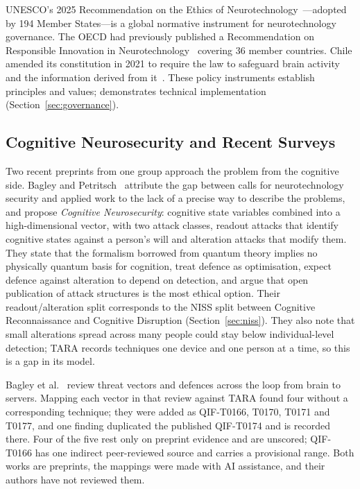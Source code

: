 UNESCO's 2025 Recommendation on the Ethics of
Neurotechnology~\cite{unesco2025recommendation}---adopted by 194 Member
States---is a global normative instrument for neurotechnology governance. The OECD had previously published a Recommendation on Responsible
Innovation in Neurotechnology~\cite{oecd2019neurotechnology} covering 36 member
countries. Chile amended its constitution in 2021 to require the law to safeguard brain
activity and the information derived from it~\cite{chile2021neurorights}. These policy instruments establish
principles and values; \qif demonstrates technical implementation
(Section~\ref{sec:governance}).

\subsection{Cognitive Neurosecurity and Recent Surveys}

Two recent preprints from one group approach the problem from the cognitive side.
Bagley and Petritsch~\cite{bagley2024mathematicalframework} attribute the gap between
calls for neurotechnology security and applied work to the lack of a precise way to
describe the problems, and propose \emph{Cognitive Neurosecurity}: cognitive state
variables combined into a high-dimensional vector, with two attack classes, readout
attacks that identify cognitive states against a person's will and alteration attacks
that modify them. They state that the formalism borrowed from quantum theory implies no
physically quantum basis for cognition, treat defence as optimisation, expect defence
against alteration to depend on detection, and argue that open publication of attack
structures is the most ethical option. Their readout/alteration split corresponds to the
NISS split between Cognitive Reconnaissance and Cognitive Disruption
(Section~\ref{sec:niss}). They also note that small alterations spread across many people
could stay below individual-level detection; TARA records techniques one device and one
person at a time, so this is a gap in its model.

Bagley et al.~\cite{bagley2026threatvectors} review threat vectors and defences across
the loop from brain to servers. Mapping each vector in that review against TARA found
four without a corresponding technique; they were added as QIF-T0166, T0170, T0171 and
T0177, and one finding duplicated the published QIF-T0174 and is recorded there. Four of the five rest only on preprint
evidence and are unscored; QIF-T0166 has one indirect peer-reviewed source and carries a
provisional range. Both works are preprints, the mappings were
made with AI assistance, and their authors have not reviewed them.

